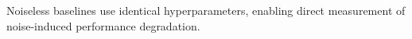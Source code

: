 Noiseless baselines use identical hyperparameters, enabling direct measurement of noise-induced performance degradation.




